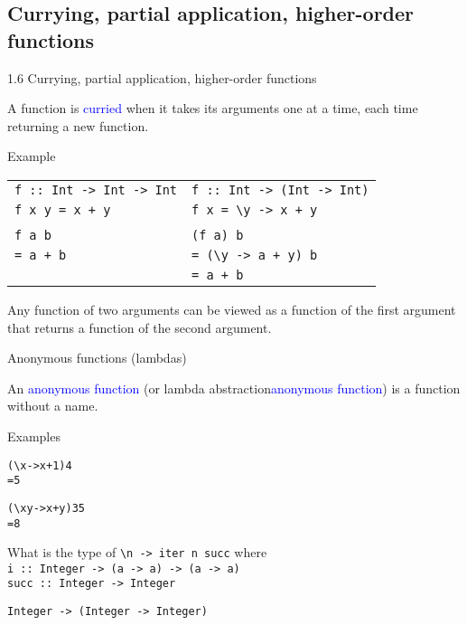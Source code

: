 \documentclass{beamer}
\def\code#1{\texttt{\frenchspacing#1}}
\begin{document}
\subsection{Currying, partial application, higher-order functions}

\begin{frame}{1.6 Currying, partial application, higher-order functions}

A function is \textcolor{blue}{curried} when it takes its arguments one at a time, each time returning a new function.

\pause

\begin{exampleblock}{Example}
\begin{tabularx}{\textwidth}{ll}
    \code{f :: Int -> Int -> Int} & \code{f :: Int -> (Int -> Int)} \\
    \code{f x y = x + y} & \code{f x = \textbackslash y -> x + y} \\
    & \\
    \code{f a b} & \code{(f a) b} \\
    \code{= a + b} & \code{= (\textbackslash y -> a + y) b} \\
    & \code{= a + b}
\end{tabularx}
\end{exampleblock}

\pause

\begin{block}{\centering Any function of two arguments can be viewed as a function of the first argument that returns a function of the second argument.}
\end{block}

\end{frame}

\begin{frame}[fragile]{Anonymous functions (lambdas)}

An \textcolor{blue}{anonymous function} (or lambda abstraction\textcolor{blue}{anonymous function}) is a function without a name.

\begin{exampleblock}{Examples}
\begin{alltt}
({\textbackslash}x -> x + 1) 4\pause
= 5

({\textbackslash}x y -> x + y) 3 5\pause
= 8
\end{alltt}
\end{exampleblock}

\pause

What is the type of \code{\textbackslash n -> iter n succ} where \\
\code{i :: Integer -> (a -> a) -> (a -> a)} \\
\code{succ :: Integer -> Integer}

\pause

\vspace{0.25cm}
\code{Integer -> (Integer -> Integer)}

\end{frame}
\end{document}

